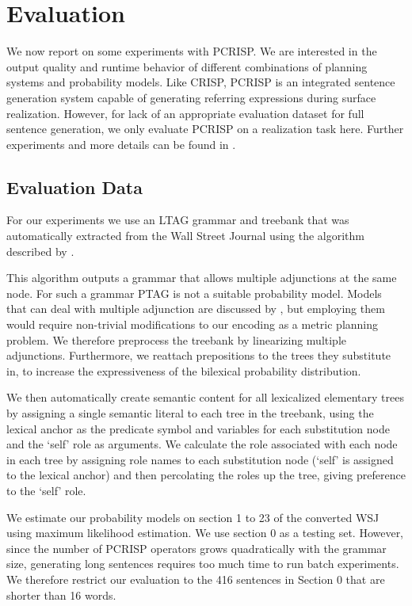 \section{Evaluation}
\label{sec:experiments}

We now report on some experiments with PCRISP. We are interested in the output quality and runtime behavior of different combinations of planning systems and probability models. Like CRISP, PCRISP is an integrated sentence generation system capable of generating referring expressions during surface realization.  However, for lack of an appropriate evaluation dataset for full sentence generation, we only evaluate PCRISP on a realization task here.  Further experiments and more details can be found in .

\subsection{Evaluation Data}
For our experiments we use an LTAG grammar and treebank that was automatically extracted from the Wall Street Journal using the algorithm described by .   

This algorithm outputs a grammar that allows multiple adjunctions at the same node. For such a grammar PTAG is not a suitable probability model. Models that can deal with multiple adjunction are discussed by , but employing them would require non-trivial modifications to our encoding as a metric planning problem. We therefore preprocess the treebank by linearizing multiple adjunctions. Furthermore, we reattach prepositions to the trees they substitute in, to increase the expressiveness of the bilexical probability distribution.

We then automatically create semantic content for all lexicalized elementary trees by assigning a single semantic literal to each tree in the treebank, using the lexical anchor as the predicate symbol and variables for each substitution node and the `self' role as arguments.  We calculate the role associated with each node in each tree by assigning role names to each substitution node (`self' is assigned to the lexical anchor) and then percolating the roles up the tree, giving preference to the `self' role.  

We estimate our probability models on section 1 to 23 of the converted WSJ using maximum likelihood estimation. We use section 0 as a testing set. However, since the number of PCRISP operators grows quadratically with the grammar size, generating long sentences requires too much time to run batch experiments.  We therefore restrict our evaluation to the 416 sentences in Section 0 that are shorter than 16 words.

